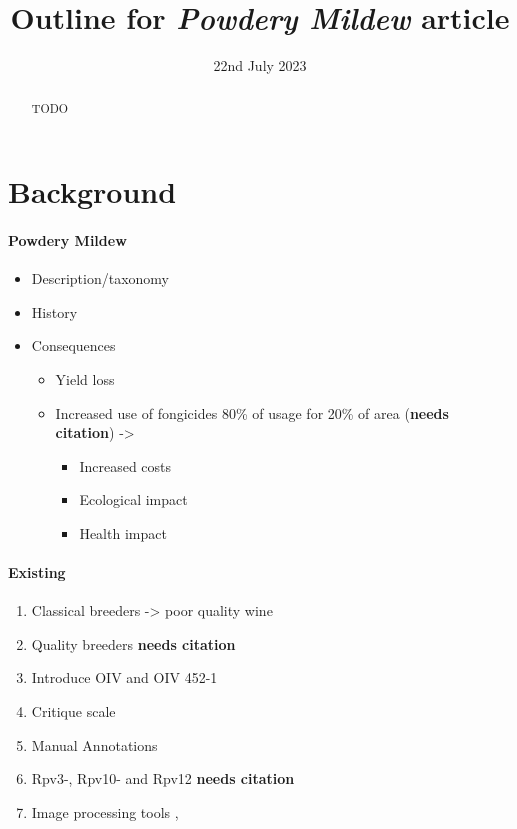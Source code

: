 \documentclass[english]{article}
\title{ Outline for \textit{Powdery Mildew} article}
\date{22nd July 2023}
\author{}
\begin{document}
\maketitle

\begin{changemargin}{60pt}{60pt}
	\begin{abstract}
		TODO
	\end{abstract}
\end{changemargin}

\section*{Background}

\paragraph*{Powdery Mildew}

\begin{itemize}
	\item Description/taxonomy
	\item History \parencite*{fontaineEuropeBridgeheadWorldwide2021}
	\item Consequences
	      \begin{itemize}
		      \item Yield loss
		      \item Increased use of fongicides 80\% of usage for 20\% of area (\textbf{needs citation}) ->
		            \begin{itemize}
			            \item Increased costs
			            \item Ecological impact
			            \item Health impact
		            \end{itemize}
	      \end{itemize}
\end{itemize}

\paragraph*{Existing}

\begin{enumerate}
	\item Classical breeders -> poor quality wine
	\item Quality breeders \textbf{needs citation}
	\item Introduce OIV and OIV 452-1
	\item Critique scale \parencite{possamaiPhenotypingQTLIdentification2022}
	\item Manual Annotations
	\item Rpv3-, Rpv10- and Rpv12 \textbf{needs citation}
	\item Image processing tools \parencite{hernandezAssessmentDownyMildew2022}, \parencite{zendlerHighthroughputPhenotypingLeaf2021}
\end{enumerate}
\end{document}
